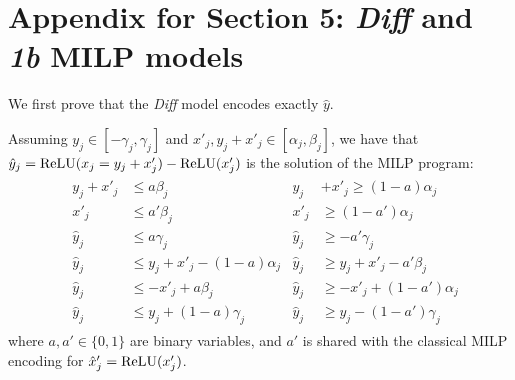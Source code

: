 \section{Appendix for Section 5: {\em Diff} and {\em 1b} MILP models}

We first prove that the {\em Diff} model encodes exactly $\hat{y}$.

\begin{proposition}
	\label{Prop4}
	Assuming $y_j \in [-\gamma_j, \gamma_j]$ and $x'_j,y_j+x'_j \in [\alpha_j,\beta_j]$, we have that $\hat{y}_j = \mathrm{ReLU}(x_j=y_j + x'_j) - \mathrm{ReLU}(x'_j)$ is the solution of the MILP program:
	\begin{align*}
		& \begin{aligned}
			y_j + x'_j &\leq a\beta_j        &
			y_j &+ x'_j \geq (1-a)\alpha_j \\
			x'_j       &\leq a'\beta_j       & 
			x'_j       &\geq (1-a')\alpha_j \\
			\hat{y}_j  &\leq a\gamma_j       &
			\hat{y}_j  &\geq -a'\gamma_j \\
			\hat{y}_j  &\leq y_j + x'_j - (1-a)\alpha_j &
			\hat{y}_j  &\geq y_j + x'_j - a'\beta_j \\
			\hat{y}_j  &\leq -x'_j + a\beta_j &
			\hat{y}_j  &\geq -x'_j + (1-a')\alpha_j \\
			\hat{y}_j  &\leq y_j + (1-a)\gamma_j  &
			\hat{y}_j  &\geq y_j - (1-a')\gamma_j
		\end{aligned}
	\end{align*} 
	where $a,a' \in \{0,1\}$ are binary variables, 
	and $a'$ is shared with the classical MILP
	encoding for $\hat{x}'_j=\mathrm{ReLU}(x'_j)$.
\end{proposition}

